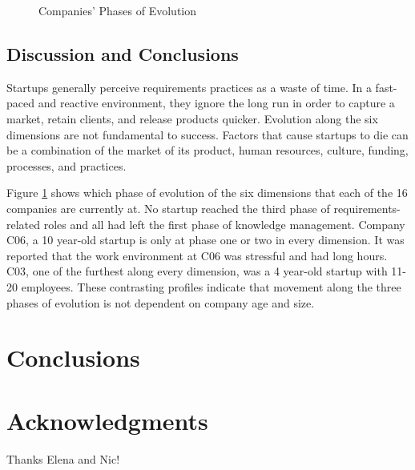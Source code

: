 \documentclass{sig-alternate}
\begin{document}
\begin{figure}
\centering
{}
\caption{Companies' Phases of Evolution}
\label{fig:companiesEvolution}
\end{figure}

\subsection{Discussion and Conclusions}
\label{sec:discussion}
Startups generally perceive requirements practices as a waste of time. In a fast-paced and reactive environment, they ignore the long run in order to capture a market, retain clients, and release products quicker. Evolution along the six dimensions are not fundamental to success. Factors that cause startups to die can be a combination of the market of its product, human resources, culture, funding, processes, and practices.

Figure \ref{fig:companiesEvolution} shows which phase of evolution of the six dimensions that each of the 16 companies are currently at. No startup reached the third phase of requirements-related roles and all had left the first phase of knowledge management. Company C06, a 10 year-old startup is only at phase one or two in every dimension.  It was reported that the work environment at C06 was stressful and had long hours. C03, one of the furthest along every dimension, was a 4 year-old startup with 11-20 employees. These contrasting profiles indicate that movement along the three phases of evolution is not dependent on company age and size. 



\section{Conclusions}
\label{sec:conclusions}

\section*{Acknowledgments}
\label{sec:acknowledgments}

Thanks Elena and Nic!


  
\end{document}
